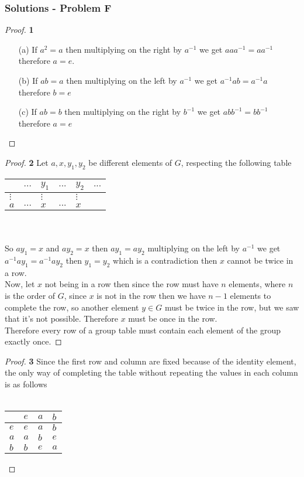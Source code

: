 \documentclass[11pt]{article}
\begin{document}
	\subsubsection*{Solutions - Problem F}
		\begin{proof}{\textbf{1}}
			\begin{itemize}
				\item[(a)] If $a^2=a$ then multiplying on the right by $a^{-1}$ we get $aaa^{-1}=aa^{-1}$ therefore $a=e$.
				\item[(b)] If $ab=a$ then multiplying on the left by $a^{-1}$ we get $a^{-1}ab=a^{-1}a$ therefore $b=e$
				\item[(c)] If $ab=b$ then multiplying on the right by $b^{-1}$ we get $abb^{-1}=bb^{-1}$ therefore $a=e$
			\end{itemize}
		\end{proof}
		\begin{proof}{\textbf{2}}
			Let $a, x, y_1, y_2$ be different elements of $G$, respecting the following table\\
			\begin{adjustbox}{max width=\textwidth,center}
			\begin{tabular}{l|lllll}
				  & $...$ & $y_1$ & $...$ & $y_2$ & $...$ \\ \hline
				$\vdots$ &  & $\vdots$ &  & $\vdots$ & \\
				$a$ & $...$ & $x$ & $...$ & $x$ &  \\
			\end{tabular}
			\end{adjustbox}
		\\\\So $ay_1=x$ and $ay_2=x$ then $ay_1=ay_2$ multiplying on the left by $a^{-1}$ we get $a^{-1}ay_1=a^{-1}ay_2$ then $y_1=y_2$ which is a contradiction then $x$ cannot be twice in a row.\\
		Now, let $x$ not being in a row then since the row must have $n$ elements, where $n$ is the order of $G$, since $x$ is not in the row then we have $n-1$ elements to complete the row, so another element $y \in G$ must be twice in the row, but we saw that it's not possible. Therefore $x$ must be once in the row.\\
		Therefore every row of a group table must contain each element of the group exactly once.
		\end{proof}
		\begin{proof}{\textbf{3}}
			Since the first row and column are fixed because of the identity element, the only way of completing the table without repeating the values in each column is as follows\\\\
			\begin{adjustbox}{max width=\textwidth,center}
			\begin{tabular}{l|lll}
				  & $e$ & $a$ & $b$ \\ \hline
				$e$ & $e$ & $a$ & $b$ \\
				$a$ & $a$ & $b$ & $e$ \\
				$b$ & $b$ & $e$ & $a$ \\
			\end{tabular}
			\end{adjustbox}
		\end{proof}
\end{document}
